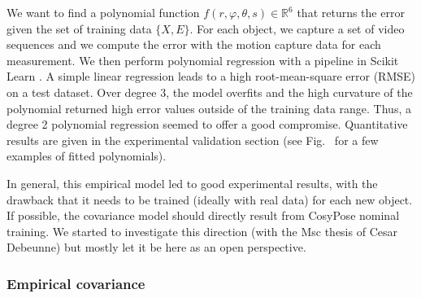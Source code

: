 We want to find a polynomial function $f(r, \varphi, \theta, s) \in \mathbb{R}^6$ that returns the error given the set of training data $\{X,E\}$. 
For each object, we capture a set of video sequences and we compute the error with the motion capture data for each measurement. 
We then perform polynomial regression with a pipeline in Scikit Learn \cite{scikit-learn}. A simple linear regression leads to a high root-mean-square error (RMSE) 
on a test dataset. Over degree 3, the model overfits and the high curvature of the polynomial returned high error values outside of the training data range. 
Thus, a degree 2 polynomial regression seemed to offer a good compromise.  Quantitative results are given in the experimental validation section 
(see Fig.~ for a few examples of fitted polynomials).


In general, this empirical model led to good experimental results, with the drawback that it needs to be trained (ideally with real data)
for each new object. If possible, the covariance model should directly result from CosyPose nominal training.
We started to investigate this direction (with the Msc thesis of Cesar Debeunne) but mostly let it be here as an open perspective.




\subsubsection{Empirical covariance}

